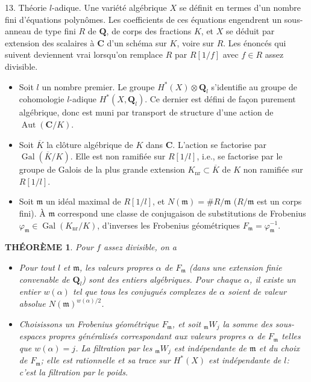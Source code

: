 \documentclass{amsart}
\theoremstyle{plain}
\newtheorem{theorem}{TH\'EOR\`EME}
\theoremstyle{definition}
\theoremstyle{remark}
\DeclareMathOperator{\Aut}{Aut}
\DeclareMathOperator{\Gal}{Gal}
\begin{document}
13. Th\'eorie $l$-adique. Une vari\'et\'e alg\'ebrique $X$ se d\'efinit en termes d'un nombre fini d'\'equations polyn\^omes. Les coefficients de ces \'equations engendrent un sous-anneau de type fini $R$ de $\mathbf{Q}$, de corps des fractions $K$, et $X$ se d\'eduit par extension des scalaires \`a $\mathbf{C}$ d'un sch\'ema sur $K$, voire sur $R$. Les \'enonc\'es qui suivent deviennent vrai lorsqu'on remplace $R$ par $R[1/f]$ avec $f \in R$ assez divisible.
\begin{itemize}
\item[(13.1)] Soit $l$ un nombre premier. Le groupe $H^*(X) \otimes \mathbf{Q}_l$ s'identifie au groupe de cohomologie $l$-adique $H^*(X, \mathbf{Q}_l)$. Ce dernier est d\'efini de fa\c{c}on purement alg\'ebrique, donc est muni par transport de structure d'une action de $\Aut(\mathbf{C}/K)$.
\item[(13.2)] Soit $\overline{K}$ la cl\^oture alg\'ebrique de $K$ dans $\mathbf{C}$. L'action se factorise par $\Gal(\overline{K}/K)$. Elle est non ramifi\'ee sur $R[1/l]$, i.e., se factorise par le groupe de Galois de la plus grande extension $K_{\mathrm{nr}} \subset \overline{K}$ de $K$ non ramifi\'ee sur $R[1/l]$.
\item[(13.3)] Soit $\mathfrak{m}$ un id\'eal maximal de $R[1/l]$, et $N(\mathfrak{m}) = \# R/\mathfrak{m}$ ($R/\mathfrak{m}$ est un corps fini). \`A $\mathfrak{m}$ correspond une classe de conjugaison de substitutions de Frobenius $\varphi_{\mathfrak{m}} \in \Gal(K_{\mathrm{nr}}/K)$, d'inverses les Frobenius g\'eom\'etriques $F_{\mathfrak{m}} = \varphi_{\mathfrak{m}}^{-1}$.
\end{itemize}

\begin{theorem}
Pour $f$ assez divisible, on a
\begin{itemize}
\item[(i)] Pour tout $l$ et $\mathfrak{m}$, les valeurs propres $\alpha$ de $F_{\mathfrak{m}}$ (dans une extension finie convenable de $\mathbf{Q}_l$) sont des entiers alg\'ebriques. Pour chaque $\alpha$, il existe un entier $w(\alpha)$ tel que tous les conjugu\'es complexes de $\alpha$ soient de valeur absolue $N(\mathfrak{m})^{w(\alpha)/2}$.
\item[(ii)] Choisissons un Frobenius g\'eom\'etrique $F_{\mathfrak{m}}$, et soit ${}_{\mathfrak{m}}W_j$ la somme des sous-espaces propres g\'en\'eralis\'es correspondant aux valeurs propres $\alpha$ de $F_{\mathfrak{m}}$ telles que $w(\alpha) = j$. La filtration par les ${}_{\mathfrak{m}}W_j$ est ind\'ependante de $\mathfrak{m}$ et du choix de $F_{\mathfrak{m}}$; elle est rationnelle et sa trace sur $H^*(X)$ est ind\'ependante de $l$: c'est la filtration par le poids.
\end{itemize}
\end{theorem}
\end{document}
